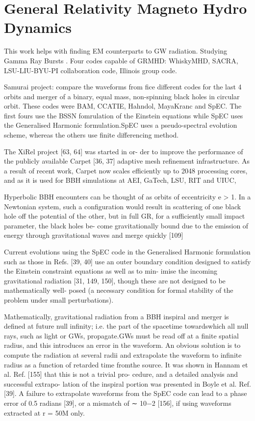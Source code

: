 \section{General Relativity Magneto Hydro Dynamics}
This work helps with finding EM counterparts to GW radiation. Studying Gamma Ray Bursts \cite{Schnetter2008}. Four codes capable of GRMHD: WhiskyMHD, SACRA, LSU-LIU-BYU-PI collaboration code, Illinois group code.

Samurai project: compare the waveforms from fice different codes for the last 4 orbits and merger of a binary, equal mass, non-spinning black holes in circular orbit. These codes were BAM, CCATIE, Hahndol, MayaKranc and SpEC. The first fours use the BSSN fomrulation of the Einstein equations while SpEC uses the Generalised Harmonic formulation.SpEC uses a pseudo-spectral evolution scheme, whereas the others use finite differencing method.

The XiRel project [63, 64] was started in or- der to improve the performance of the publicly available Carpet [36, 37] adaptive mesh refinement infrastructure. As a result of recent work, Carpet now scales efficiently up to 2048 processing cores, and as it is used for BBH simulations at AEI, GaTech, LSU, RIT and UIUC,



Hyperbolic BBH encounters can be thought of as orbits of eccentricity e > 1. In a Newtonian system, such a configuration would result in scattering of one black hole off the potential of the other, but in full GR, for a sufficiently small impact parameter, the black holes be- come gravitationally bound due to the emission of energy through gravitational waves and merge quickly [109]

Current evolutions using the SpEC code in the Generalised Harmonic formulation such as those in Refs. [39, 40] use an outer boundary condition designed to satisfy the Einstein constraint equations as well as to min- imise the incoming gravitational radiation [31, 149, 150], though these are not designed to be mathematically well- posed (a necessary condition for formal stability of the problem under small perturbations).

Mathematically, gravitational radiation from a BBH inspiral and merger is defined at future null infinity; i.e. the part of the spacetime towardswhich all null rays, such as light or GWs, propagate.GWs must be read off at a finite spatial radius, and this introduces an error in the waveform. An obvious solution is to compute the radiation at several radii and extrapolate the waveform to infinite radius as a function of retarded time fromthe source. It was shown in Hannam et al. Ref. [155] that this is not a trivial pro- cedure, and a detailed analysis and successful extrapo- lation of the inspiral portion was presented in Boyle et al. Ref. [39]. A failure to extrapolate waveforms from the SpEC code can lead to a phase error of 0.5 radians [39], or a mismatch of ∼ 10−2 [156], if using waveforms extracted at r = 50M only.

